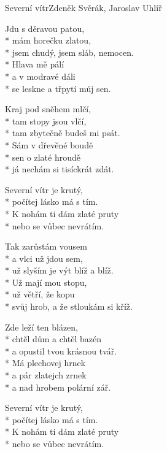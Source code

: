 \documentclass[10.5pt]{book}
\begin{document}
\begin{poem}{Severní vítr}{Zdeněk Svěrák, Jaroslav Uhlíř}

\settowidth{\versewidth}{svůj hrob, a že stloukám si kříž.}

Jdu s děravou patou,\\*
mám horečku zlatou,\\*
jsem chudý, jsem sláb, nemocen.\\*
Hlava mě pálí\\*
a v modravé dáli\\*
se leskne a třpytí můj sen.

Kraj pod sněhem mlčí,\\*
tam stopy jsou vlčí,\\*
tam zbytečně budeš mi psát.\\*
Sám v dřevěné boudě\\*
sen o zlaté hroudě\\*
já nechám si tisíckrát zdát.

Severní vítr je krutý,\\*
počítej lásko má s tím.\\*
K nohám ti dám zlaté pruty\\*
nebo se vůbec nevrátím.

Tak zarůstám vousem\\*
a vlci už jdou sem,\\*
už slyším je výt blíž a blíž.\\*
Už mají mou stopu,\\*
už větří, že kopu\\*
svůj hrob, a že stloukám si kříž.

Zde leží ten blázen,\\*
chtěl dům a chtěl bazén\\*
a opustil tvou krásnou tvář.\\*
Má plechovej hrnek\\*
a pár zlatejch zrnek\\*
a nad hrobem polární zář.

Severní vítr je krutý,\\*
počítej lásko má s tím.\\*
K nohám ti dám zlaté pruty\\*
nebo se vůbec nevrátím.

\end{poem}
\end{document}
